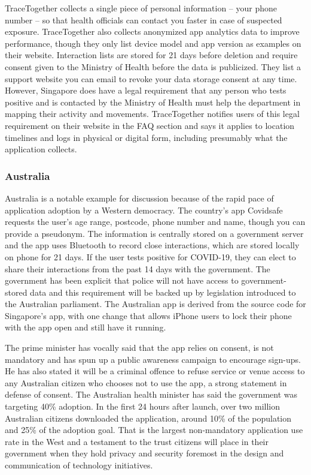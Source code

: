 \documentclass{article}
\begin{document}
TraceTogether collects a single piece of personal information – your phone number – so that health officials can contact you faster in case of suspected exposure. TraceTogether also collects anonymized app analytics data to improve performance, though they only list device model and app version as examples on their website\cite{TraceTogetherData}. Interaction lists are stored for 21 days before deletion and require consent given to the Ministry of Health before the data is publicized. They list a support website you can email to revoke your data storage consent at any time. However, Singapore does have a legal requirement that any person who tests positive and is contacted by the Ministry of Health must help the department in mapping their activity and movements. TraceTogether notifies users of this legal requirement on their website in the FAQ section and says it applies to location timelines and logs in physical or digital form, including presumably what the application collects\cite{TraceTogetherConsent}.

\subsubsection{Australia}
Australia is a notable example for discussion because of the rapid pace of application adoption by a Western democracy. The country’s app Covidsafe requests the user’s age range, postcode, phone number and name, though you can provide a pseudonym\cite{Covidsafe}. The information is centrally stored on a government server and the app uses Bluetooth to record close interactions, which are stored locally on phone for 21 days. If the user tests positive for COVID-19, they can elect to share their interactions from the past 14 days with the government. The government has been explicit that police will not have access to government-stored data and this requirement will be backed up by legislation introduced to the Australian parliament. The Australian app is derived from the source code for Singapore’s app, with one change that allows iPhone users to lock their phone with the app open and still have it running.

The prime minister has vocally said that the app relies on consent, is not mandatory and has spun up a public awareness campaign to encourage sign-ups. He has also stated it will be a criminal offence to refuse service or venue access to any Australian citizen who chooses not to use the app, a strong statement in defense of consent. The Australian health minister has said the government was targeting 40\% adoption. In the first 24 hours after launch, over two million Australian citizens downloaded the application, around 10\% of the population and 25\% of the adoption goal\cite{CovidsafeTakeup}. That is the largest non-mandatory application use rate in the West and a testament to the trust citizens will place in their government when they hold privacy and security foremost in the design and communication of technology initiatives.
\end{document}
